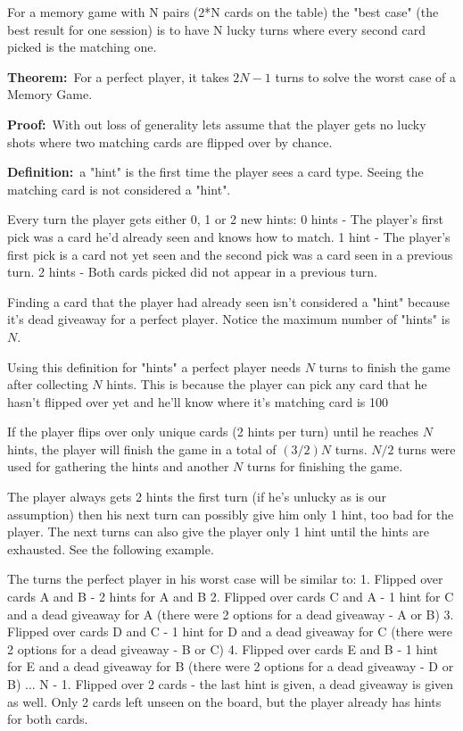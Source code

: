 \documentclass[12pt]{article}
\begin{document}
For a memory game with N pairs (2*N cards on the table) the "best case" (the best result for one session) is to have N lucky turns where every second card picked is the matching one.

\textbf{Theorem:}\ For a perfect player, it takes $2N - 1$ turns to solve the worst case of a Memory Game.

\textbf{Proof:}\
With out loss of generality lets assume that the player gets no lucky shots where two matching cards are flipped over by chance.

\textbf{Definition:}\ a "hint" is the first time the player sees a card type. Seeing the matching card is not considered a "hint".

Every turn the player gets either 0, 1 or 2 new hints:
0 hints - The player's first pick was a card he'd already seen and knows how to match.
1 hint - The player's first pick is a card not yet seen and the second pick was a card seen in a previous turn.
2 hints - Both cards picked did not appear in a previous turn.

Finding a card that the player had already seen isn't considered a "hint" because it's dead giveaway for a perfect player. Notice the maximum number of "hints" is $N$.

Using this definition for "hints" a perfect player needs $N$ turns to finish the game after collecting $N$ hints. This is because the player can pick any card that he hasn't flipped over yet and he'll know where it's matching card is 100%

If the player flips over only unique cards (2 hints per turn) until he reaches $N$ hints, the player will finish the game in a total of $(3 / 2)N$ turns. $N / 2$ turns were used for gathering the hints and another $N$ turns for finishing the game.

The player always gets 2 hints the first turn (if he's unlucky as is our assumption) then his next turn can possibly give him only 1 hint, too bad for the player. The next turns can also give the player only 1 hint until the hints are exhausted. See the following example.

The turns the perfect player in his worst case will be similar to:
1. Flipped over cards A and B - 2 hints for A and B
2. Flipped over cards C and A - 1 hint for C and a dead giveaway for A (there were 2 options for a dead giveaway - A or B)
3. Flipped over cards D and C - 1 hint for D and a dead giveaway for C (there were 2 options for a dead giveaway - B or C)
4. Flipped over cards E and B - 1 hint for E and a dead giveaway for B (there were 2 options for a dead giveaway - D or B)
...
N - 1. Flipped over 2 cards - the last hint is given, a dead giveaway is given as well. Only 2 cards left unseen on the board, but the player already has hints for both cards.
\end{document}
